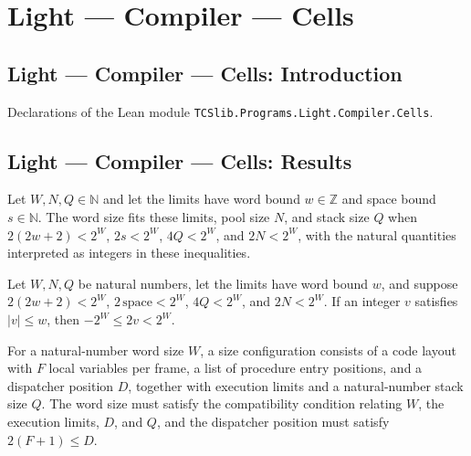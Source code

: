 \section{Light --- Compiler --- Cells}
\subsection*{Light --- Compiler --- Cells: Introduction}

Declarations of the Lean module \texttt{TCSlib.Programs.Light.Compiler.Cells}.

\subsection*{Light --- Compiler --- Cells: Results}

\begin{definition}
\label{Light.Compiler.Fits}
\leanok
{}
Let $W,N,Q\in\mathbb N$ and let the limits have word bound $w\in\mathbb Z$ and space
bound $s\in\mathbb N$. The word size fits these limits, pool size $N$, and stack size
$Q$ when $2(2w+2)<2^W$, $2s<2^W$, $4Q<2^W$, and $2N<2^W$, with the natural quantities
interpreted as integers in these inequalities.
\end{definition}

\begin{theorem}
\label{Light.Compiler.Fits.inRange}
\leanok
{}
Let $W,N,Q$ be natural numbers, let the limits have word bound $w$, and suppose
$2(2w+2)<2^W$, $2\,\mathrm{space}<2^W$, $4Q<2^W$, and $2N<2^W$. If an integer $v$
satisfies $|v|\le w$, then $-2^W\le 2v<2^W$.
\end{theorem}

\begin{definition}
\label{Light.Compiler.Sizes}
\leanok
{}
For a natural-number word size $W$, a size configuration consists of a code layout with
$F$ local variables per frame, a list of procedure entry positions, and a dispatcher
position $D$, together with execution limits and a natural-number stack size $Q$. The
word size must satisfy the compatibility condition relating $W$, the execution limits,
$D$, and $Q$, and the dispatcher position must satisfy $2(F+1)\le D$.
\end{definition}

